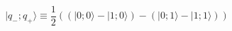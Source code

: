 \begin{equation}
\label{2mp}
|q_-;q_+ \rangle \equiv \frac{1}{2}\left(  
(|0;0 \rangle-|1;0 \rangle)-(|0;1 \rangle-|1;1 \rangle)\right)
\end{equation}

